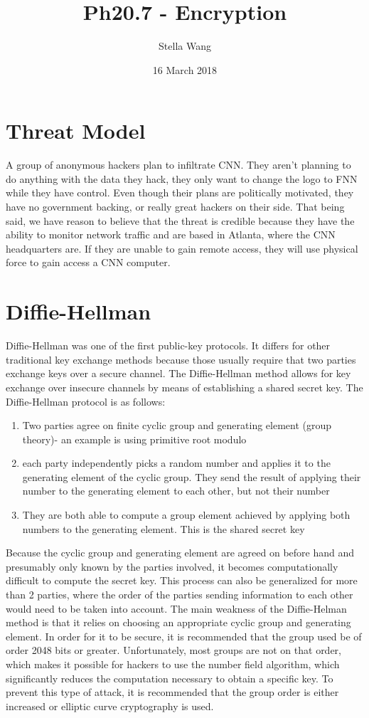 \documentclass{article}
\title{Ph20.7 - Encryption}
\author{Stella Wang}
\date{16 March 2018}
\begin{document}
	\maketitle
\section{Threat Model}
A group of anonymous hackers plan to infiltrate CNN. They aren't planning to do anything with the data they hack, they only want to change the logo to FNN while they have control. Even though their plans are politically motivated, they have no government backing, or really great hackers on their side. That being said, we have reason to believe that the threat is credible because they have the ability to monitor network traffic and are based in Atlanta, where the CNN headquarters are. If they are unable to gain remote access, they will use physical force to gain access a CNN computer. 
\section{Diffie-Hellman}
Diffie-Hellman was one of the first public-key protocols. It differs for other traditional key exchange methods because those usually require that two parties exchange keys over a secure channel. The Diffie-Hellman method allows for key exchange over insecure channels by means of establishing a shared secret key. The Diffie-Hellman protocol is as follows: 
\begin{enumerate}
	\item Two parties agree on finite cyclic group and generating element (group theory)- an example is using primitive root modulo
	\item each party independently picks a random number and applies it to the generating element of the cyclic group. They send the result of applying their number to the generating element to each other, but not their number
	\item They are both able to compute a group element achieved by applying both numbers to the generating element. This is the shared secret key
\end{enumerate}
Because the cyclic group and generating element are agreed on before hand and presumably only known by the parties involved, it becomes computationally difficult to compute the secret key.  This process can also be generalized for more than 2 parties, where the order of the parties sending information to each other would need to be taken into account. The main weakness of the Diffie-Helman method is that it relies on choosing an appropriate cyclic group and generating element. In order for it to be secure, it is recommended that the group used be of order 2048 bits or greater. Unfortunately, most groups are not on that order, which makes it possible for hackers to use the number field algorithm, which significantly reduces the computation necessary to obtain a specific key. To prevent this type of attack, it is recommended that the group order is either increased or elliptic curve cryptography is used. 
\end{document}
